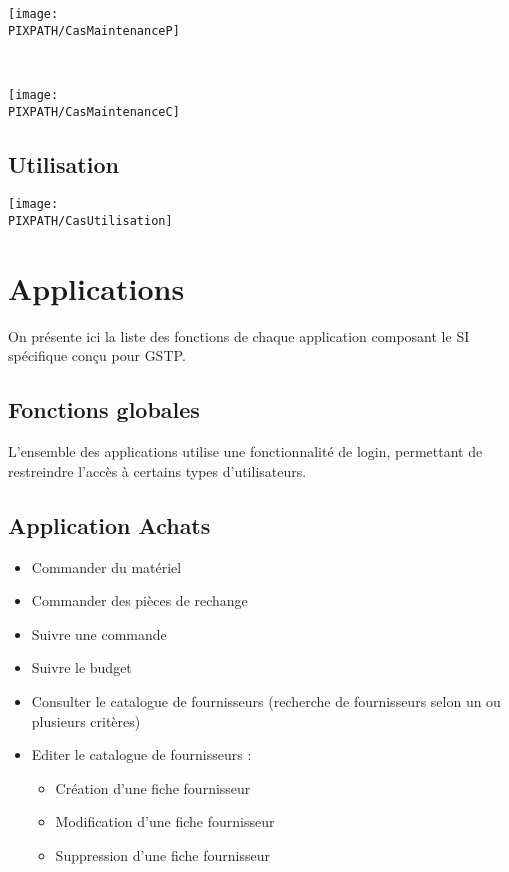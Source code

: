 \documentclass[twoside]{article}
\newcommand\PIXPATH{./docs/pics}
\begin{document}
\begin{center}
\texttt{[image: \\PIXPATH/CasMaintenanceP]}
\end{center}

\hfill\\

\begin{center}
\texttt{[image: \\PIXPATH/CasMaintenanceC]}
\end{center}

\subsection{Utilisation}

\begin{center}
\texttt{[image: \\PIXPATH/CasUtilisation]}
\end{center}


\section{Applications}

On présente ici la liste des fonctions de chaque application composant le
SI spécifique conçu pour GSTP.


\subsection{Fonctions globales}

L'ensemble des applications utilise une fonctionnalité de login, permettant
de restreindre l'accès à certains types d'utilisateurs.


\subsection{Application Achats}

\begin{itemize}
\item Commander du matériel
\item Commander des pièces de rechange
\item Suivre une commande
\item Suivre le budget
\item Consulter le catalogue de fournisseurs (recherche de fournisseurs selon 
un ou plusieurs critères)
\item Editer le catalogue de fournisseurs :
	\begin{itemize}
	\item Création d'une fiche fournisseur
	\item Modification d'une fiche fournisseur
	\item Suppression d'une fiche fournisseur
	\end{itemize}
\end{itemize}
\end{document}
